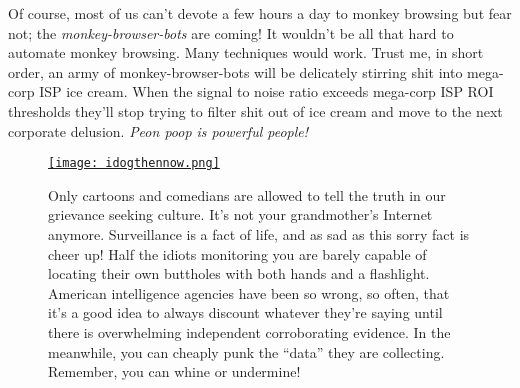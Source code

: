 Of course, most of us can't devote a few hours a day to monkey browsing
but fear not; the \emph{monkey-browser-bots} are coming! It wouldn't be
all that hard to automate monkey browsing. Many techniques would work.
Trust me, in short order, an army of monkey-browser-bots will be
delicately stirring shit into mega-corp ISP ice cream. When the signal
to noise ratio exceeds mega-corp ISP ROI thresholds they'll stop trying
to filter shit out of ice cream and move to the next corporate delusion.
\emph{Peon poop is powerful people!}

\captionsetup[figure]{labelformat=empty}
\begin{figure}[htbp]
\centering
\href{http://www.geekculture.com/joyoftech/joyarchives/1862.html}{\texttt{[image: idogthennow.png]}}
\caption{Only cartoons and comedians are allowed to tell the truth in our grievance
seeking culture. It’s not your grandmother’s Internet anymore. Surveillance is a
fact of life, and as sad as this sorry fact is cheer up! Half the idiots monitoring
you are barely capable of locating their own buttholes with both hands and a flashlight.
American intelligence agencies have been so wrong, so often, that it’s a good
idea to always discount whatever they’re saying until there is overwhelming
independent corroborating evidence. In the meanwhile, you can 
cheaply punk the “data” they are collecting. Remember, you can whine or undermine!}
\label{fig:5358X0}
\end{figure}



%